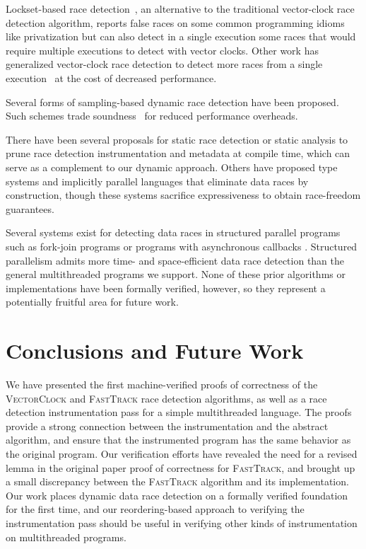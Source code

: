 \documentclass[preprint, 9pt]{sigplanconf}
\newcommand{\VCalg}{\textsc{VectorClock}\xspace}
\newcommand{\FT}{\textsc{FastTrack}\xspace}
\begin{document}
Lockset-based race detection~\cite{dinning_detecting_1991,savage_eraser:_1997}, an alternative to the traditional vector-clock race detection algorithm, reports false races on some common programming idioms like privatization but can also detect in a single execution some races that would require multiple executions to detect with vector clocks. Other work has generalized vector-clock race detection to detect more races from a single execution~\cite{smaragdakis_sound_2012,sen_detecting_2005,chen_parametric_2007} at the cost of decreased performance.

Several forms of sampling-based dynamic race detection have been proposed. Such schemes trade soundness~\cite{greathouse_demand-driven_2011,bond_pacer:_2010,marino_literace:_2009,erickson_effective_2010,effinger-dean_ifrit:_2012} for reduced performance overheads.

There have been several proposals for static race detection \cite{engler_racerx:_2003,naik_effective_2006} or static analysis \cite{flanagan_redcard:_2013,Das:2015:SPA:2775085.2766451} to prune race detection instrumentation and metadata at compile time, which can serve as a complement to our dynamic approach. Others have proposed type systems \cite{abadi_types_2006,bocchino_type_2009} and implicitly parallel languages \cite{rinard_design_1998,guy_blelloch_nesl:_1992} that eliminate data races by construction, though these systems sacrifice expressiveness to obtain race-freedom guarantees.

Several systems exist for detecting data races in structured parallel programs
such as fork-join programs
\cite{john_mellor-crummey_--fly_1991,Bender:2004:sporder:1007912.1007933,mai_zheng_grace:_2011,boyer2008automated,raman:spd3} or programs with asynchronous callbacks \cite{petrov_race_2012,raychev_effective_2013,hsiao_race_2014,Bielik:2015:SRD:2814270.2814303}. Structured parallelism admits more time- and space-efficient data race detection than the general multithreaded programs we support. None of these prior algorithms or implementations have been formally verified, however, so they represent a potentially fruitful area for future work.

\section{Conclusions and Future Work}
\label{conclusion}

We have presented the first machine-verified proofs of correctness of the \VCalg and \FT race detection algorithms, as well as a race detection instrumentation pass for a simple multithreaded language. The proofs provide a strong connection between the instrumentation and the abstract algorithm, and ensure that the instrumented program has the same behavior as the original program.  Our verification efforts have revealed the need for a revised lemma in the original paper proof of correctness for \FT, and brought up a small discrepancy between the \FT algorithm and its implementation.  Our work places dynamic data race detection on a formally verified foundation for the first time, and our reordering-based approach to verifying the instrumentation pass should be useful in verifying other kinds of instrumentation on multithreaded programs.
\end{document}
